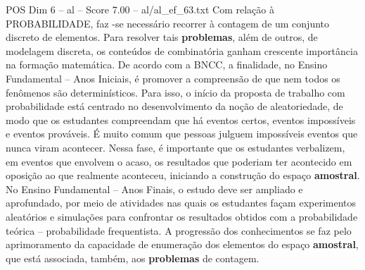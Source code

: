 \begin{textsample}{POS Dim 6 – al – Score 7.00 – al/al\_ef\_63.txt}
Com relação à PROBABILIDADE, faz -se necessário recorrer à contagem de um conjunto discreto de elementos.
Para resolver tais \textbf{problemas}, além de outros, de modelagem discreta, os conteúdos de combinatória ganham crescente importância na formação matemática.
De acordo com a BNCC, a finalidade, no Ensino Fundamental – Anos Iniciais, é promover a compreensão de que nem todos os fenômenos são determinísticos.
Para isso, o início da proposta de trabalho com probabilidade está centrado no desenvolvimento da noção de aleatoriedade, de modo que os estudantes compreendam que há eventos certos, eventos impossíveis e eventos prováveis.
É muito comum que pessoas julguem impossíveis eventos que nunca viram acontecer.
Nessa fase, é importante que os estudantes verbalizem, em eventos que envolvem o acaso, os resultados que poderiam ter acontecido em oposição ao que realmente aconteceu, iniciando a construção do espaço \textbf{amostral}.
No Ensino Fundamental – Anos Finais, o estudo deve ser ampliado e aprofundado, por meio de atividades nas quais os estudantes façam experimentos aleatórios e simulações para confrontar os resultados obtidos com a probabilidade teórica – probabilidade frequentista.
A progressão dos conhecimentos se faz pelo aprimoramento da capacidade de enumeração dos elementos do espaço \textbf{amostral}, que está associada, também, aos \textbf{problemas} de contagem.

\end{textsample}
